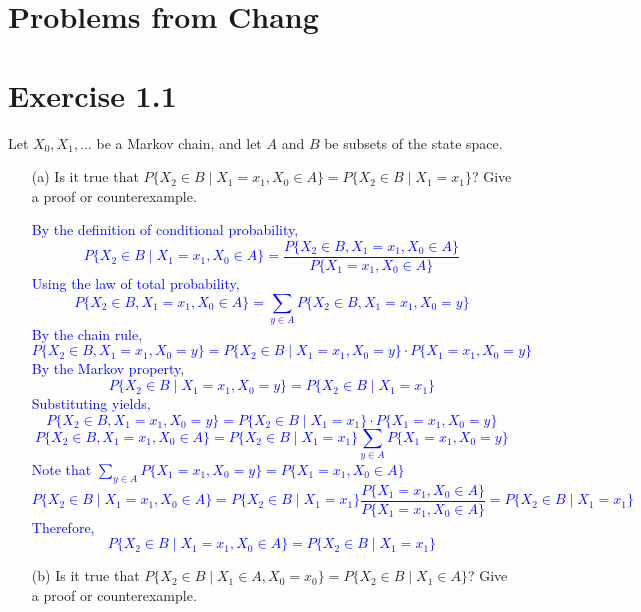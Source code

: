 \documentclass{article}
\begin{document}
\section*{Problems from Chang}

\section*{Exercise 1.1}
Let $X_0, X_1, \ldots$ be a Markov chain, and let $A$ and $B$ be subsets of the state space.

\begin{enumerate}
    \item[(a)] Is it true that $P\{X_2 \in B \mid X_1 = x_1, X_0 \in A\} = P\{X_2 \in B \mid X_1 = x_1\}$? Give a proof or counterexample.

    \textcolor{blue}{By the definition of conditional probability,
$$P\{X_2 \in B \mid X_1 = x_1, X_0 \in A\} = \frac{P\{X_2 \in B, X_1 = x_1, X_0 \in A\}}{P\{X_1 = x_1, X_0 \in A\}}$$
Using the law of total probability,
$$P\{X_2 \in B, X_1 = x_1, X_0 \in A\} = \sum_{y \in A} P\{X_2 \in B, X_1 = x_1, X_0 = y\}$$
By the chain rule,
$$P\{X_2 \in B, X_1 = x_1, X_0 = y\} = P\{X_2 \in B \mid X_1 = x_1, X_0 = y\} \cdot P\{X_1 = x_1, X_0 = y\}$$
By the Markov property,
$$P\{X_2 \in B \mid X_1 = x_1, X_0 = y\} = P\{X_2 \in B \mid X_1 = x_1\}$$
Substituting yields,
$$P\{X_2 \in B, X_1 = x_1, X_0 = y\} = P\{X_2 \in B \mid X_1 = x_1\} \cdot P\{X_1 = x_1, X_0 = y\}$$
$$P\{X_2 \in B, X_1 = x_1, X_0 \in A\} = P\{X_2 \in B \mid X_1 = x_1\} \sum_{y \in A} P\{X_1 = x_1, X_0 = y\}$$
Note that $\sum_{y \in A} P\{X_1 = x_1, X_0 = y\} = P\{X_1 = x_1, X_0 \in A\}$ \\
$$P\{X_2 \in B \mid X_1 = x_1, X_0 \in A\} = P\{X_2 \in B \mid X_1 = x_1\} \frac{P\{X_1 = x_1, X_0 \in A\}}{P\{X_1 = x_1, X_0 \in A\}} = P\{X_2 \in B \mid X_1 = x_1\}$$
Therefore, $$P\{X_2 \in B \mid X_1 = x_1, X_0 \in A\} = P\{X_2 \in B \mid X_1 = x_1\}$$}


    \item[(b)] Is it true that $P\{X_2 \in B \mid X_1 \in A, X_0 = x_0\} = P\{X_2 \in B \mid X_1 \in A\}$? Give a proof or counterexample.



\end{enumerate}
\end{document}
